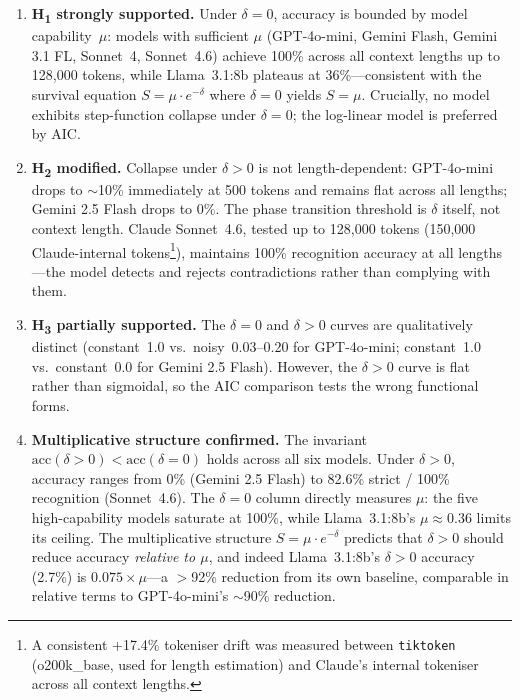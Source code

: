 \documentclass[11pt,a4paper]{article}
\begin{document}
\begin{enumerate}
  \item \textbf{H\textsubscript{1} strongly supported.} Under $\delta = 0$, accuracy is bounded by model capability~$\mu$: models with sufficient $\mu$ (GPT-4o-mini, Gemini Flash, Gemini 3.1 FL, Sonnet~4, Sonnet~4.6) achieve 100\% across all context lengths up to 128{,}000 tokens, while Llama~3.1:8b plateaus at 36\%---consistent with the survival equation $S = \mu \cdot e^{-\delta}$ where $\delta = 0$ yields $S = \mu$. Crucially, no model exhibits step-function collapse under $\delta = 0$; the log-linear model is preferred by AIC.

  \item \textbf{H\textsubscript{2} modified.} Collapse under $\delta > 0$ is not length-dependent: GPT-4o-mini drops to $\sim$10\% immediately at 500 tokens and remains flat across all lengths; Gemini 2.5 Flash drops to 0\%. The phase transition threshold is $\delta$ itself, not context length. Claude Sonnet~4.6, tested up to 128{,}000 tokens (150{,}000 Claude-internal tokens\footnote{A consistent +17.4\% tokeniser drift was measured between \texttt{tiktoken} (o200k\_base, used for length estimation) and Claude's internal tokeniser across all context lengths.}), maintains 100\% recognition accuracy at all lengths---the model detects and rejects contradictions rather than complying with them.

  \item \textbf{H\textsubscript{3} partially supported.} The $\delta = 0$ and $\delta > 0$ curves are qualitatively distinct (constant~1.0 vs.\ noisy~0.03--0.20 for GPT-4o-mini; constant~1.0 vs.\ constant~0.0 for Gemini 2.5 Flash). However, the $\delta > 0$ curve is flat rather than sigmoidal, so the AIC comparison tests the wrong functional forms.

  \item \textbf{Multiplicative structure confirmed.} The invariant $\text{acc}(\delta > 0) < \text{acc}(\delta = 0)$ holds across all six models. Under $\delta > 0$, accuracy ranges from 0\% (Gemini 2.5 Flash) to 82.6\% strict / 100\% recognition (Sonnet~4.6). The $\delta = 0$ column directly measures $\mu$: the five high-capability models saturate at 100\%, while Llama~3.1:8b's $\mu \approx 0.36$ limits its ceiling. The multiplicative structure $S = \mu \cdot e^{-\delta}$ predicts that $\delta > 0$ should reduce accuracy \emph{relative to $\mu$}, and indeed Llama~3.1:8b's $\delta > 0$ accuracy (2.7\%) is $0.075 \times \mu$---a $>$92\% reduction from its own baseline, comparable in relative terms to GPT-4o-mini's $\sim$90\% reduction.
\end{enumerate}
\end{document}
